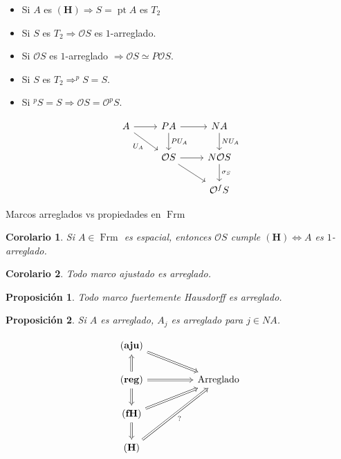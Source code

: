 \documentclass[compress,12pt]{beamer}
\DeclareMathOperator{\pt}{pt}
\DeclareMathOperator{\Frm}{Frm}
\newtheorem{cor}{Corolario}
\newtheorem{prop}{Proposición}
\begin{document}
\begin{frame}[fragile]
\begin{itemize}
\item Si $A$ es $\mathbf{(H)}\Rightarrow S=\pt A$ es $T_2$
\item<2-> Si $S$ es $T_2\Rightarrow \mathcal{O}S$ es $1$-arreglado.
\item<3-> Si $\mathcal{O}S$ es $1$-arreglado $\Rightarrow \mathcal{O}S\simeq P\mathcal{O}S$.
\item<4-> Si $S$ es $T_2\Rightarrow ^pS=S$.
\item<5-> Si $^pS=S\Rightarrow \mathcal{O}S=\mathcal{O}^pS$.
\end{itemize}
\[\begin{tikzcd}
	A & PA & NA \\
	& {\mathcal{O}S} & {N\mathcal{O}S} \\
	&& {\mathcal{O}^fS}
	\arrow[from=1-1, to=1-2]
	\arrow["{U_A}"', from=1-1, to=2-2]
	\arrow[from=1-2, to=1-3]
	\arrow["{PU_A}", from=1-2, to=2-2]
	\arrow["{NU_A}", from=1-3, to=2-3]
	\arrow[from=2-2, to=2-3]
	\arrow[from=2-2, to=3-3]
	\arrow["{\sigma_S}", from=2-3, to=3-3]
\end{tikzcd}\]
\end{frame}

\begin{frame}{Marcos arreglados vs propiedades en $\Frm$}
\begin{cor}
Si $A\in \Frm$ es espacial, entonces $\mathcal{O}S$ cumple $\mathbf{(H)}\Leftrightarrow A$ es $1$-arreglado.
\end{cor}

\begin{cor}
	Todo marco ajustado es arreglado.
\end{cor}

\begin{prop}
Todo marco fuertemente Hausdorff es arreglado.
\end{prop}

\begin{prop}
Si $A$ es arreglado, $A_j$ es arreglado para $j\in NA$.
\end{prop}

\end{frame}

\begin{frame}[fragile]
\[\begin{tikzcd}
	{\mathbf{(aju)}} \\
	{\mathbf{(reg)}} && {\mbox{Arreglado}} \\
	{\mathbf{(fH)}} \\
	{\mathbf{(H)}}
	\arrow[Rightarrow, from=1-1, to=2-3]
	\arrow[Rightarrow, from=2-1, to=1-1]
	\arrow[Rightarrow, from=2-1, to=2-3]
	\arrow[Rightarrow, from=2-1, to=3-1]
	\arrow[Rightarrow, from=3-1, to=2-3]
	\arrow[Rightarrow, from=3-1, to=4-1]
	\arrow["{?}"', Rightarrow, from=4-1, to=2-3]
\end{tikzcd}\]
\end{frame}
\end{document}
